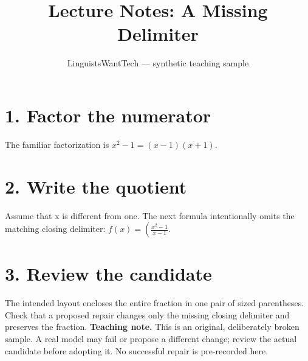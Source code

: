\documentclass[12pt]{article}
\title{Lecture Notes: A Missing Delimiter}
\author{LinguistsWantTech --- synthetic teaching sample}
\date{}
\begin{document}
\maketitle
\section*{1. Factor the numerator}
The familiar factorization is $x^2-1=(x-1)(x+1)$.
\section*{2. Write the quotient}
Assume that x is different from one. The next formula intentionally
omits the matching closing delimiter:
$\displaystyle f(x)=\left(\frac{x^2-1}{x-1}$.
\section*{3. Review the candidate}
The intended layout encloses the entire fraction in one pair of
sized parentheses. Check that a proposed repair changes only the
missing closing delimiter and preserves the fraction.
\textbf{Teaching note.} This is an original, deliberately broken sample.
A real model may fail or propose a different change; review the actual
candidate before adopting it. No successful repair is pre-recorded here.
\end{document}
